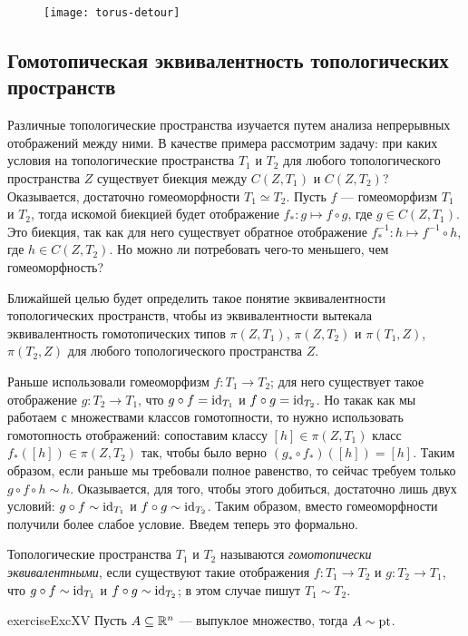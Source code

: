 \documentclass[main]{subfiles}
\begin{document}
\begin{figure}[H]
	\centering \texttt{[image: torus-detour]}
\end{figure}

\subsection{Гомотопическая эквивалентность топологических пространств}

Различные топологические пространства изучается путем анализа непрерывных отображений между ними. В качестве примера
рассмотрим задачу: при каких условия на топологические пространства $ T_1 $ и $ T_2 $ для любого топологического
пространства $ Z $ существует биекция между $ C(Z, T_1) $ и $ C(Z, T_2) $? Оказывается, достаточно гомеоморфности
$ T_1 \simeq T_2 $. Пусть $ f $ --- гомеоморфизм $ T_1 $ и $ T_2 $, тогда искомой биекцией будет отображение
$ f_* \colon g \mapsto f \circ g $, где $ g \in C(Z, T_1) $. Это биекция, так как для него существует
обратное отображение $ f_*^{-1} \colon h \mapsto f^{-1} \circ h $, где $ h \in C(Z, T_2) $. Но можно ли потребовать
чего-то меньшего, чем гомеоморфность?

Ближайшей целью будет определить такое понятие эквивалентности топологических пространств, чтобы из эквивалентности
вытекала эквивалентность гомотопических типов $ \pi(Z, T_1) $, $ \pi(Z, T_2) $ и $ \pi(T_1, Z) $, $ \pi(T_2, Z) $
для любого топологического пространства $ Z $.

Раньше использовали гомеоморфизм $ f \colon T_1 \to T_2 $; для него существует такое отображение
$ g \colon T_2 \to T_1 $, что  $ g \circ f = \operatorname{id}_{T_1} $ и $ f \circ g = \operatorname{id}_{T_2} $. Но такак как мы работаем с
множествами классов гомотопности, то нужно использовать гомотопность отображений: сопоставим классу
$ [h] \in \pi(Z, T_1) $ класс $ f_*([h]) \in \pi(Z, T_2) $ так, чтобы было верно $ (g_* \circ f_*) ([h]) = [h] $.
Таким образом, если раньше мы требовали полное равенство, то сейчас требуем только
$ g \circ f \circ h \sim h $. Оказывается, для того, чтобы этого добиться, достаточно лишь двух условий:
$ g \circ f \sim \operatorname{id}_{T_1} $ и $ f \circ g \sim \operatorname{id}_{T_2} $. Таким образом, вместо гомеоморфности получили
более слабое условие. Введем теперь это формально.

\begin{definition}
	Топологические пространства $ T_1 $ и $ T_2 $ называются \emph{гомотопически эквивалентными}, если существуют такие
	отображения $ f \colon T_1 \to T_2 $ и $ g \colon T_2 \to T_1 $, что $ g \circ f \sim \operatorname{id}_{T_1} $ и
	$ f \circ g \sim \operatorname{id}_{T_2} $; в этом случае пишут $ T_1 \sim T_2 $.
\end{definition}

\begin{restatable}{exercise}{ExcXV}
	Пусть $ A \subseteq \mathbb{R}^n $ --- выпуклое множество, тогда $ A \sim \operatorname{pt} $.
\end{restatable}
\end{document}
